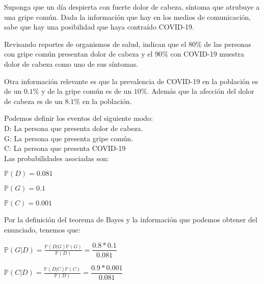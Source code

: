 \addpoints

\question[15] Suponga que un día despierta con fuerte dolor de cabeza, síntoma que atrubuye a una gripe común. Dada la información que hay en los medios de comunicación, sabe que hay una posibilidad que haya contraído COVID-19. 

Revisando reportes de organismos de salud,  indican que el $80\%$ de las personas con gripe común presentan dolor de cabeza y el $90\%$ con COVID-19 muestra dolor de cabeza como uno de sus síntomas.

Otra información relevante es que la prevalencia de COVID-19 en la población es de un $0.1\%$ y de la gripe común es de un $10\%$. Además que la afección del dolor de cabeza es de un $8.1\%$ en la población.

\noaddpoints
{}

\begin{solution}
Podemos definir los eventos del siguiente modo:\\

D: La persona que presenta dolor de cabeza.\\

G: La persona que presenta gripe común.\\

C: La persona que presenta COVID-19\\

Las probabilidades asociadas son:

$\mathbb{P}(D)=0.081$

$\mathbb{P}(G)=0.1$

$\mathbb{P}(C)=0.001$

Por la definición del teorema de Bayes y la información que podemos obtener del enunciado, tenemos que:

$\mathbb{P}(G|D)=\frac{\mathbb{P}(D|G) \mathbb{P}(G)}{\mathbb{P}(D)} =\dfrac{0.8*0.1}{0.081} $

$\mathbb{P}(C|D)=\frac{\mathbb{P}(D|C) \mathbb{P}(C)}{\mathbb{P}(D)} =\dfrac{0.9*0.001}{0.081} $

\end{solution}